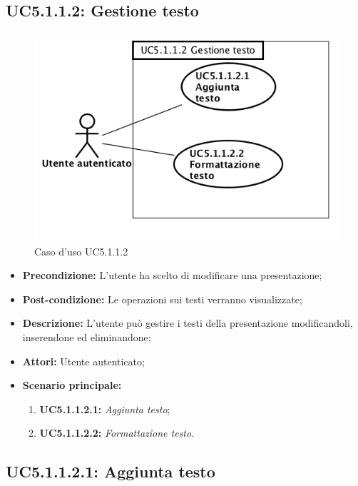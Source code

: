\subsection{ UC5.1.1.2: Gestione testo}

\begin{figure}[h]
	\begin{center}
	\includegraphics[scale=0.4]{diagram/UC5-1-1-2.png}
	\caption{Caso d'uso UC5.1.1.2}
	\end{center}
\end{figure}
\begin{itemize}
	\item \textbf{Precondizione:} L'utente ha scelto di modificare una presentazione;
	\item \textbf{Post-condizione:} Le operazioni sui testi verranno visualizzate;
	\item \textbf{Descrizione:} L'utente può gestire i testi della presentazione modificandoli, inserendone ed eliminandone;
	\item \textbf{Attori:} Utente autenticato;
	\item \textbf{Scenario principale:}
	\begin{enumerate}
		\item \textbf{ UC5.1.1.2.1:} \textit{ Aggiunta testo};
		\item \textbf{ UC5.1.1.2.2:} \textit{ Formattazione testo}.
	\end{enumerate}
\end{itemize}
\subsection{ UC5.1.1.2.1: Aggiunta testo}


